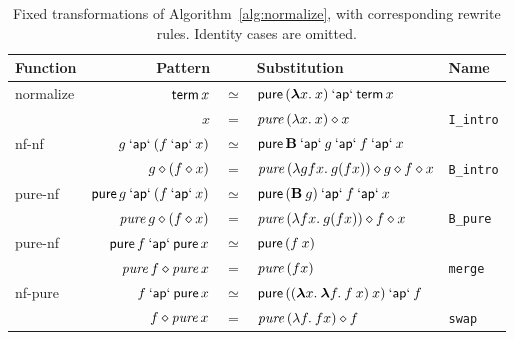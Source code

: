 \begin{table}[t]\centering\small
\begin{tabular}{lrcll}
Function & Pattern & & Substitution & Name \\
\hline
normalize & $\sterm x$ & $\simeq$ & $\spure{(\sabs{x}{x})} \sap \sterm x$ \\
	& $x$ & $=$ & $\pure{(\abs{x}{x})} \ap x$ & \texttt{I\_intro} \\[1ex]
nf-nf & $g \sap (f \sap x)$ & $\simeq$ & $\spure \mathbf{B} \sap g \sap f \sap x$ \\
	& $g \ap (f \ap x)$ & $=$ & $\pure{(\abs{g f x}{g (f x)})} \ap g \ap f \ap x$ & \texttt{B\_intro} \\[1ex]
pure-nf & $\spure g \sap (f \sap x)$ & $\simeq$ & $\spure{(\mathbf{B} \sapp g)} \sap f \sap x$ \\
	& $\pure g \ap (f \ap x)$ & $=$ & $\pure{(\abs{f x}{g (f x)})} \ap f \ap x$ & \texttt{B\_pure} \\[1ex]
pure-nf & $\spure f \sap \spure x$ & $\simeq$ & $\spure{(f \sapp x)}$ \\
	& $\pure f \ap \pure x$ & $=$ & $\pure{(f x)}$ & \texttt{merge} \\[1ex]
nf-pure & $f \sap \spure x$ & $\simeq$ & $\spure{((\sabs{x}{\sabs{f}{f \sapp x}}) \sapp x)} \sap f$ \\
	& $f \ap \pure x$ & $=$ & $\pure{(\abs{f}{f x})} \ap f$ & \texttt{swap}
\end{tabular}
\caption{Fixed transformations of Algorithm~\ref{alg:normalize}, with
corresponding rewrite rules. Identity cases are omitted.}
\label{tab:normalize-rules}
\end{table}


